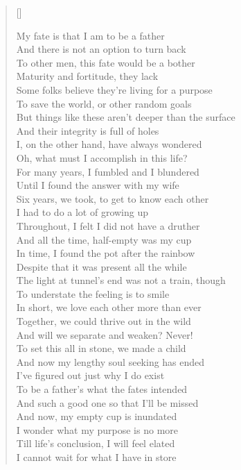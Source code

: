 \documentclass[a5paper,10pt,twoside]{memoir}
\begin{document}
\settowidth{\versewidth}{But things like these aren't deeper than the surface}
\PlainPoemTitle %
{}
\begin{verse}[\versewidth]

My fate is that I am to be a father\\
And there is not an option to turn back\\
To other men, this fate would be a bother\\
Maturity and fortitude, they lack\\
Some folks believe they're living for a purpose\\
To save the world, or other random goals\\
But things like these aren't deeper than the surface\\
And their integrity is full of holes\\
I, on the other hand, have always wondered\\
Oh, what must I accomplish in this life?\\
For many years, I fumbled and I blundered\\
Until I found the answer with my wife\\
Six years, we took, to get to know each other\\
I had to do a lot of growing up\\
Throughout, I felt I did not have a druther\\
And all the time, half-empty was my cup\\
In time, I found the pot after the rainbow\\
Despite that it was present all the while\\
The light at tunnel's end was not a train, though\\
To understate the feeling is to smile\\
In short, we love each other more than ever\\
Together, we could thrive out in the wild\\
And will we separate and weaken? Never!\\
To set this all in stone, we made a child\\
And now my lengthy soul seeking has ended\\
I've figured out just why I do exist\\
To be a father's what the fates intended\\
And such a good one so that I'll be missed\\
And now, my empty cup is inundated\\
I wonder what my purpose is no more\\
Till life's conclusion, I will feel elated\\
I cannot wait for what I have in store\\
\end{verse}
\end{document}
